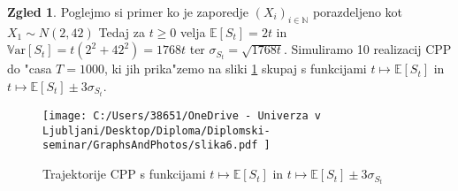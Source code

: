 \documentclass[12pt, a4paper, reqno]{amsart}
\theoremstyle{definition}
\newtheorem{zgled}[definicija]{Zgled}
\theoremstyle{plain}
\newcommand{\R}{\mathbb{R}}
\newcommand{\N}{\mathbb{N}}
\newcommand{\E}{\mathbb{E}}
\newcommand{\Prob}{\mathbb{P}}
\newcommand{\1}{\mathds{1}}
\newcommand{\Var}[1]{\text{$\mathbb{V}\!\mathrm{ar}$}\left[#1\right]}
\begin{document}
    \begin{zgled}
        Poglejmo si primer ko je zaporedje $(X_i)_{i\in\N}$ porazdeljeno kot $X_1\sim N(2, 42)$ 
        Tedaj za $t\geq 0 $ velja $\E\left[S_t\right] = 2t$ in 
        $\Var{S_t} = t(2^2 + 42^2) = 1768t$ ter $\sigma_{S_t} = \sqrt{1768t}$. Simuliramo 10 realizacij CPP do "casa $T=1000$, 
        ki jih prika"zemo na sliki \ref{fig:slika6} skupaj s funkcijami $t \mapsto \E\left[S_t\right]$ in $t \mapsto \E\left[S_t\right] \pm 3\sigma_{S_t}$. 
        \begin{figure}[H]
            \centering
            \texttt{[image: 
                C:/Users/38651/OneDrive - Univerza v Ljubljani/Desktop/Diploma/Diplomski-seminar/GraphsAndPhotos/slika6.pdf
                ]}
            \caption{Trajektorije CPP s funkcijami $t \mapsto \E\left[S_t\right]$ in $t \mapsto \E\left[S_t\right] \pm 3\sigma_{S_t}$}
            \label{fig:slika6}
        \end{figure}

    \end{zgled}
    
%
%
%
%
%
%
%
%
\end{document}
